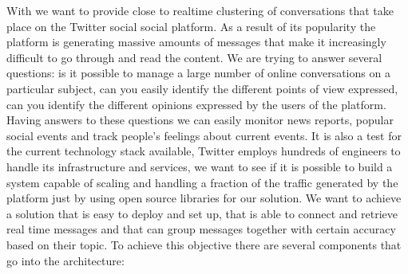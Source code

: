 With \textbf{\project} we want to provide close to realtime 
clustering of conversations that take place on the Twitter social social platform. As a result of its popularity the platform is generating massive amounts of messages that make it increasingly difficult to go through and read the content. We are trying to answer several questions: is it possible to manage a large number of online conversations on a particular subject, can you easily  identify the different points of view expressed, can you identify the different opinions expressed by the users of the platform.
\newline
\newline
Having answers to these questions we can easily monitor news reports, popular social events and track people's feelings about current events. It is also a test for the current technology stack available, Twitter employs hundreds of engineers to handle its infrastructure and services, we want to see if it is possible to build a system capable of scaling and handling a fraction of the traffic generated by the platform just by using open source libraries for our solution.
\newline
We want to achieve a solution that is easy to deploy and set up, that is able to connect and retrieve real time messages and that can group messages together with certain accuracy based on their topic.
\newline
To achieve this objective there are several components that go into the architecture:
